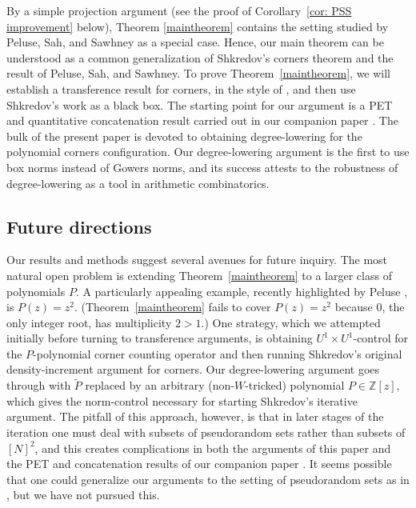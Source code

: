 \documentclass[11pt]{amsart}
\theoremstyle{definition}
\begin{document}
By a simple projection argument (see the proof of Corollary~\ref{cor: PSS improvement} below), Theorem \ref{maintheorem} contains the setting studied by Peluse, Sah, and Sawhney as a special case. Hence, our main theorem can be understood as a common generalization of Shkredov's corners theorem and the result of Peluse, Sah, and Sawhney.  To prove Theorem~\ref{maintheorem}, we will establish a transference result for corners, in the style of \cite{PSS23}, and then use Shkredov's work as a black box.  The starting point for our argument is a PET and quantitative concatenation result carried out in our companion paper \cite{KKL24a}.  The bulk of the present paper is devoted to obtaining degree-lowering for the polynomial corners configuration.  Our degree-lowering argument is the first to use box norms instead of Gowers norms, and its success attests to the robustness of degree-lowering as a tool in arithmetic combinatorics.


\subsection{Future directions}
Our results and methods suggest several avenues for future inquiry.  The most natural open problem is extending Theorem~\ref{maintheorem} to a larger class of polynomials $P$.  A particularly appealing example, recently highlighted by Peluse \cite[Problem 3.17]{Pel23}, is $P(z)=z^2$.  (Theorem~\ref{maintheorem} fails to cover $P(z)=z^2$ because $0$, the only integer root, has multiplicity $2>1$.)  One strategy, which we attempted initially before turning to transference arguments, is obtaining $U^1 \times U^1$-control for the $P$-polynomial corner counting operator and then running Shkredov's original density-increment argument for corners.  Our degree-lowering argument goes through with $\widetilde P$ replaced by an arbitrary (non-$W$-tricked) polynomial $P \in \mathbb{Z}[z]$, which gives the norm-control necessary for starting Shkredov's iterative argument.  The pitfall of this approach, however, is that in later stages of the iteration one must deal with subsets of pseudorandom sets rather than subsets of $[N]^2$, and this creates complications in both the arguments of this paper and the PET and concatenation results of our companion paper \cite{KKL24a}.  It seems possible that one could generalize our arguments to the setting of pseudorandom sets as in \cite{Sh06b, Sh06a}, but we have not pursued this.
\end{document}
